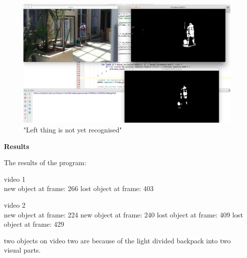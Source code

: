 \documentclass[12pt]{article}
\begin{document}
	\begin{figure}[H]
		\centering
		\includegraphics[width=15cm]{2}
		\caption{"Left thing is not yet recognised"}
	\end{figure}
	
	\medskip
	
	\textbf{Results}
	
	The results of the program:

	video 1\\
	new object at frame: 266
	lost object at frame: 403

	video 2\\
	new object at frame: 224
	new object at frame: 240
	lost object at frame: 409
	lost object at frame: 429
	
	two objects on video two are because of the light divided backpack into two visual parts.
	
\end{document}
